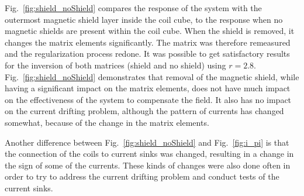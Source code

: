 
Fig.~\ref{fig:shield_noShield} compares the response of the system
with the outermost magnetic shield layer inside the coil cube, to the
response when no magnetic shields are present within the coil cube.  When the
shield is removed, it changes the matrix elements significantly. The
matrix was therefore remeasured and the regularization process redone.
It was possible to get satisfactory results for the inversion of both
matrices (shield and no shield) using $r=2.8$.
Fig.~\ref{fig:shield_noShield} demonstrates that removal of the
magnetic shield, while having a significant impact on the matrix
elements, does not have much impact on the effectiveness of the system
to compensate the field.  It also has no impact on the current
drifting problem, although the pattern of currents has changed
somewhat, because of the change in the matrix elements.

Another difference between Fig.~\ref{fig:shield_noShield} and
Fig.~\ref{fig:i_pi} is that the connection of the coils to current
sinks was changed, resulting in a change in the sign of some of the
currents.  These kinds of changes were also done often in order to try
to address the current drifting problem and conduct tests of the
current sinks.





